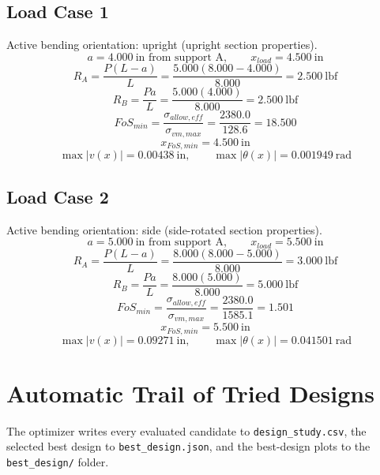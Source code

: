 \documentclass[11pt]{article}
\begin{document}
\subsection*{Load Case 1}
Active bending orientation: upright (upright section properties).
\[a = 4.000\ \mathrm{in} \text{ from support A}, \qquad x_{load} = 4.500\ \mathrm{in}\]
\[R_A = \frac{P(L-a)}{L} = \frac{5.000(8.000-4.000)}{8.000} = 2.500\ \mathrm{lbf}\]
\[R_B = \frac{Pa}{L} = \frac{5.000(4.000)}{8.000} = 2.500\ \mathrm{lbf}\]
\[FoS_{min} = \frac{\sigma_{allow,eff}}{\sigma_{vm,max}} = \frac{2380.0}{128.6} = 18.500\]
\[x_{FoS,min} = 4.500\ \mathrm{in}\]
\[\max |v(x)| = 0.00438\ \mathrm{in}, \qquad \max |\theta(x)| = 0.001949\ \mathrm{rad}\]
\subsection*{Load Case 2}
Active bending orientation: side (side-rotated section properties).
\[a = 5.000\ \mathrm{in} \text{ from support A}, \qquad x_{load} = 5.500\ \mathrm{in}\]
\[R_A = \frac{P(L-a)}{L} = \frac{8.000(8.000-5.000)}{8.000} = 3.000\ \mathrm{lbf}\]
\[R_B = \frac{Pa}{L} = \frac{8.000(5.000)}{8.000} = 5.000\ \mathrm{lbf}\]
\[FoS_{min} = \frac{\sigma_{allow,eff}}{\sigma_{vm,max}} = \frac{2380.0}{1585.1} = 1.501\]
\[x_{FoS,min} = 5.500\ \mathrm{in}\]
\[\max |v(x)| = 0.09271\ \mathrm{in}, \qquad \max |\theta(x)| = 0.041501\ \mathrm{rad}\]

\section*{Automatic Trail of Tried Designs}
The optimizer writes every evaluated candidate to \texttt{design\_study.csv}, the selected best design to \texttt{best\_design.json}, and the best-design plots to the \texttt{best\_design/} folder.
\end{document}
